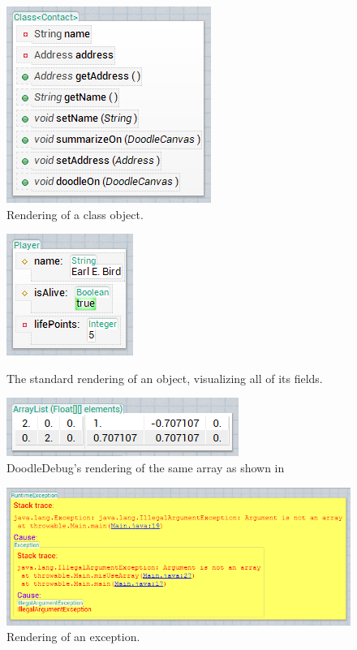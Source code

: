 \documentclass[english]{scrartcl}
\newcommand{\DD}{Dood\-le\-De\-bug\xspace}
\begin{document}
\begin{figure}[h]
	\centering
	\includegraphics[width=0.5\linewidth]{img/Plugin_Class.png}
	\caption{Rendering of a class object.}
\end{figure}

\begin{figure}[h]
\begin{minipage}{.5\linewidth}
	\centering
	\includegraphics{img/FieldDoodler_player.png}
	\caption{The standard rendering of an object, visualizing all of its fields.}
\end{minipage}
\begin{minipage}{.5\linewidth}
	\centering
	\includegraphics{img/matrix-array.png}
	\caption{\DD's rendering of the same array as shown in }
\end{minipage}
\end{figure}

\begin{figure}[h]
	\includegraphics[width=\linewidth]{img/Plugin_Throwable-outermost.png}
	\caption{Rendering of an exception.}
\end{figure}
\end{document}
